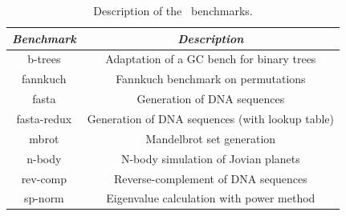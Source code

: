 \begin{description}

\begin{table}[hb]
\begin{center}
\begin{small}
    \begin{tabular}{ |c|c| }
        \hline
        {\em Benchmark} & {\em Description} \\ 
        \hline
        \hline
        b-trees & Adaptation of a GC bench for binary trees \\ 
        \hline
        fannkuch & Fannkuch benchmark on permutations \\ 
        \hline
        fasta & Generation of DNA sequences \\ 
        \hline
        fasta-redux & Generation of DNA sequences (with lookup table) \\ 
        \hline
        mbrot & Mandelbrot set generation \\ 
        \hline
        n-body & N-body simulation of Jovian planets \\ 
        \hline
        rev-comp & Reverse-complement of DNA sequences \\ 
        \hline
        sp-norm & Eigenvalue calculation with power method \\ 
        \hline
    \end{tabular} 
\end{small}
\end{center}
\caption{\label{tab:shootout} Description of the \shootout\ benchmarks.} 
\end{table}


\end{description}
